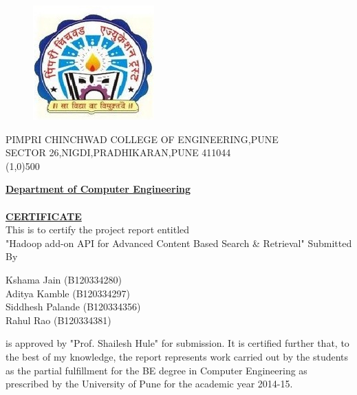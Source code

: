 \newpage
    \thispagestyle{empty}
    {
    \begin{figure}[!nt]
    \centering\includegraphics[scale=.20]{pccoe_logo.jpg}
    \label{PCCOE}
    \end{figure}
    \begin{center}

      { PIMPRI CHINCHWAD COLLEGE OF ENGINEERING,PUNE}\\
     { SECTOR 26,NIGDI,PRADHIKARAN,PUNE 411044}\\
 \line (1,0){500} \\
    \end{center}
    \begin{center}
    {
    \textbf {\underline {Department of Computer Engineering} } \\
    \hfill \\
    \textbf {\underline {CERTIFICATE}} \\
    This is to certify the project report entitled \\
    "Hadoop add-on API for Advanced Content Based Search \& Retrieval" 
\newline
\newline
    Submitted By \\
    }
    \end{center}
    \begin{center}
    \large{Kshama Jain} {(B120334280)}\\
    \large{Aditya Kamble} {(B120334297)}\\
    \large{Siddhesh Palande} {(B120334356)}\\
    \large{Rahul Rao} {(B120334381)}\\


    \end{center}
    is approved by "Prof. Shailesh Hule" for submission. It is certified further that, to the best of my knowledge, the report represents work carried out by the students as the partial fulfillment for the BE degree in Computer Engineering as prescribed by the University of Pune for the academic year 2014-15.
    }
